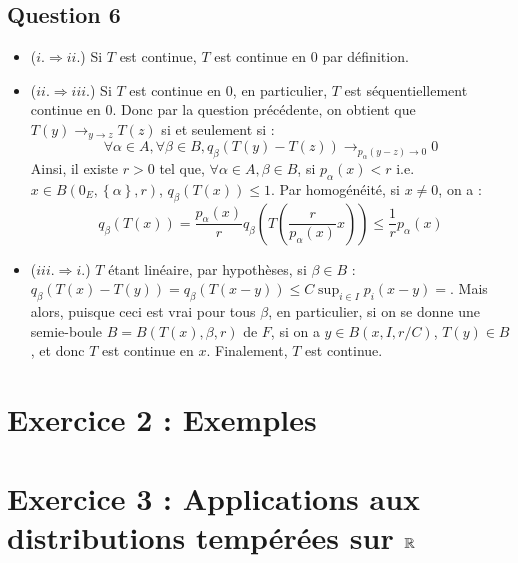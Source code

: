 \documentclass{cours}
\begin{document}
        \subsection{Question 6}
            \begin{itemize}
                \item ($i. \Rightarrow ii.$) Si $T$ est continue, $T$ est continue en $0$ par définition. 
                \item ($ii. \Rightarrow iii.$) Si $T$ est continue en $0$, en particulier, $T$ est séquentiellement continue en $0$. Donc par la question précédente, on obtient que $T(y) \to_{y \to z} T(z)$ si et seulement si :  \[\forall \alpha \in A,\forall \beta \in B, q_{\beta}(T(y) - T(z)) \to_{p_{\alpha}(y - z) \to 0} 0\]
                Ainsi, il existe $r > 0$ tel que, $\forall \alpha \in A, \beta \in B$, si $p_{\alpha}(x) < r$ i.e. $x \in B(0_{E}, \left\{\alpha\right\}, r)$, $q_{\beta}(T(x)) \leq 1$. Par homogénéité, si $x \neq 0$, on a : \[q_{\beta}(T(x)) = \frac{p_{\alpha}(x)}{r} q_{\beta}\left(T\left(\frac{r}{p_{\alpha}(x)}x\right)\right) \leq \frac{1}{r}p_{\alpha}(x)\]
                \item ($iii. \Rightarrow i.$) $T$ étant linéaire, par hypothèses, si $\beta \in B$ : $q_{\beta}(T(x) - T(y)) = q_{\beta}(T(x-y)) \leq C \sup_{i\in I} p_{i}(x - y) = $. Mais alors, puisque ceci est vrai pour tous $\beta$, en particulier, si on se donne une semie-boule $B = B(T(x), {\beta}, r)$ de $F$, si on a $y \in B(x, I, r/C)$, $T(y) \in B$, et donc $T$ est continue en $x$. Finalement, $T$ est continue.
            \end{itemize}


    \section{Exercice 2 : Exemples}

    \section{Exercice 3 : Applications aux distributions tempérées sur $\mathbb{R}$}
\end{document}
